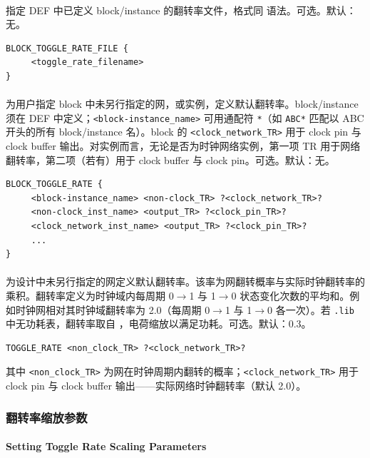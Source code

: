 \paragraph{}
指定 DEF 中已定义 block/instance 的翻转率文件，格式同  语法。可选。默认：无。
\begin{lstlisting}
BLOCK_TOGGLE_RATE_FILE {
     <toggle_rate_filename>
}
\end{lstlisting}

\paragraph{}
为用户指定 block 中未另行指定的网，或实例，定义默认翻转率。block/instance 须在 DEF 中定义；\texttt{<block-instance\_name>} 可用通配符 \texttt{*}（如 \texttt{ABC*} 匹配以 ABC 开头的所有 block/instance 名）。block 的 \texttt{<clock\_network\_TR>} 用于 clock pin 与 clock buffer 输出。对实例而言，无论是否为时钟网络实例，第一项 TR 用于网络翻转率，第二项（若有）用于 clock buffer 与 clock pin。可选。默认：无。
\begin{lstlisting}
BLOCK_TOGGLE_RATE {
     <block-instance_name> <non-clock_TR> ?<clock_network_TR>?
     <non-clock_inst_name> <output_TR> ?<clock_pin_TR>?
     <clock_network_inst_name> <output_TR> ?<clock_pin_TR>?
     ...
}
\end{lstlisting}

\paragraph{}
为设计中未另行指定的网定义默认翻转率。该率为网翻转概率与实际时钟翻转率的乘积。翻转率定义为时钟域内每周期 0$\rightarrow$1 与 1$\rightarrow$0 状态变化次数的平均和。例如时钟网相对其时钟域翻转率为 2.0（每周期 0$\rightarrow$1 与 1$\rightarrow$0 各一次）。若 \texttt{.lib} 中无功耗表，翻转率取自 ，电荷缩放以满足功耗。可选。默认：0.3。
\begin{lstlisting}
TOGGLE_RATE <non_clock_TR> ?<clock_network_TR>?
\end{lstlisting}
其中 \texttt{<non\_clock\_TR>} 为网在时钟周期内翻转的概率；\texttt{<clock\_network\_TR>} 用于 clock pin 与 clock buffer 输出——实际网络时钟翻转率（默认 2.0）。

\subsubsection{翻转率缩放参数}
\paragraph*{Setting Toggle Rate Scaling Parameters}

